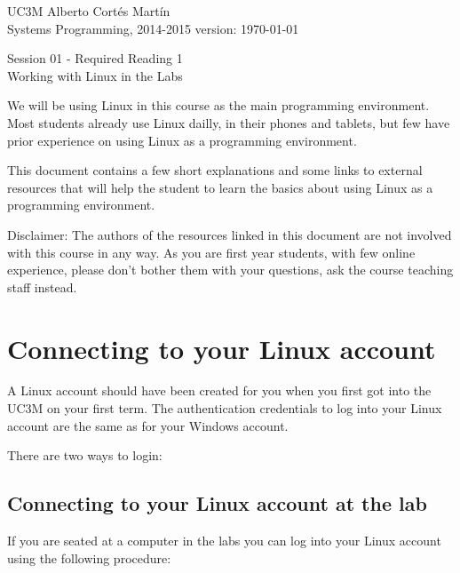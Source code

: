 \documentclass[a4paper, 12pt]{article}
\newcommand{\realtitle}{Session 01 - Required Reading 1}
\begin{document}
\makebox[\linewidth]{\rule{\textwidth}{0.4pt}}
UC3M \hfill Alberto Cortés Martín\\
Systems Programming, 2014-2015 \hfill version: \today\\
\makebox[\linewidth]{\rule{\textwidth}{0.4pt}}
\begin{center}
  \Large{\realtitle}\\Working with Linux in the Labs
\end{center}
\makebox[\linewidth]{\rule{\textwidth}{0.4pt}}
\vspace{0.5cm}

\tableofcontents
\vspace{1cm}

We will be using Linux in this course as the main programming environment.
Most students already use Linux dailly, in their phones and tablets, but few
have prior experience on using Linux as a programming environment.

This document contains a few short explanations and some links to external
resources that will help the student to learn the basics about using Linux as a
programming environment.

Disclaimer: The authors of the resources linked in this document are not
involved with this course in any way. As you are first year students, with few
online experience, please don't bother them with your questions, ask the
course teaching staff instead.

\section{Connecting to your Linux account}

A Linux account should have been created for you when you first got into the
UC3M on your first term.  The authentication credentials to log into your Linux
account are the same as for your Windows account.

There are two ways to login:

\subsection{Connecting to your Linux account at the lab}

  If you are seated at a computer in the labs you can log into your Linux
  account using the following procedure:
\end{document}
